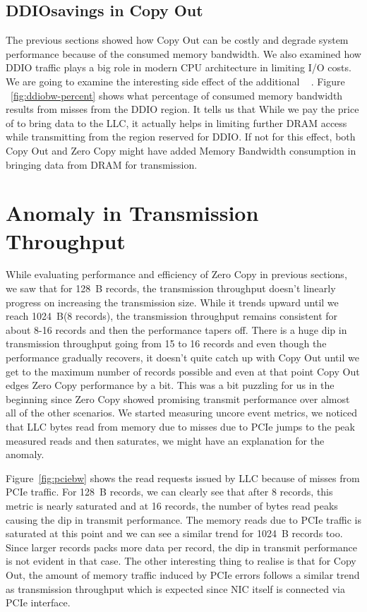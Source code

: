 \subsection{DDIO\textregistered savings in Copy Out}
\label{sec:ddiobw-savings}

The previous sections showed how Copy Out can be costly and degrade system performance because of the consumed memory bandwidth. We also examined how DDIO traffic plays a big role 
in modern CPU architecture in limiting I/O costs. We are going to examine the interesting side effect of the additional \memcpy~ . Figure ~\ref{fig:ddiobw-percent} shows what percentage of consumed 
memory bandwidth results from misses from the DDIO region. It tells us that While we pay the price of \memcpy to bring data to the LLC, it actually helps in limiting further DRAM access while transmitting 
from the region reserved for DDIO\textregistered. If not for this effect, both Copy Out and Zero Copy might have added Memory Bandwidth consumption in bringing data from DRAM for transmission. 


\section{Anomaly in Transmission Throughput}

While evaluating performance and efficiency of Zero Copy in previous sections, we saw that for 128~B records, the transmission throughput doesn't linearly progress 
on increasing the transmission size. While it trends upward until we reach 1024~B(8 records), the transmission throughput remains consistent for about 8-16 records and 
then the performance tapers off. There is a huge dip in transmission throughput going from 15 to 16 records and even though the performance gradually recovers, it doesn't quite 
catch up with Copy Out until we get to the maximum number of records possible and even at that point Copy Out edges Zero Copy performance by a bit. This was a bit puzzling 
for us in the beginning since Zero Copy showed promising transmit performance over almost all of the other scenarios. We started measuring uncore event metrics, we noticed 
that LLC bytes read from memory due to misses due to PCIe jumps to the peak measured reads and then saturates, we might have an explanation for the anomaly. 

Figure~\ref{fig:pciebw} shows the read requests issued by LLC because of misses from PCIe traffic. For 128~B records, we can clearly see that after 8 records, this metric is 
nearly saturated and at 16 records, the number of bytes read peaks causing the dip in transmit performance. The memory reads due to PCIe traffic is saturated at this point and 
we can see a similar trend for 1024~B records too. Since larger records packs more data per record, the dip in transmit performance is not evident in that case. The other interesting 
thing to realise is that for Copy Out, the amount of memory traffic induced by PCIe errors follows a similar trend as transmission throughput which is expected since 
NIC itself is connected via PCIe interface.

